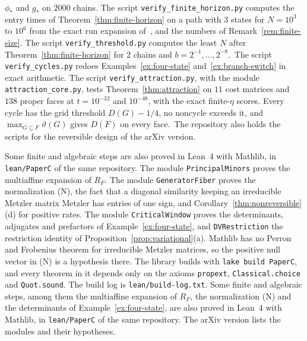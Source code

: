 $\phi_*$ and $g_*$ on $2000$ chains. The script \texttt{verify\_finite\_horizon.py} computes the
entry times of Theorem~\ref{thm:finite-horizon} on a path with 3 states for $N=10^3$ to $10^6$
from the exact run expansion of~\cite[Lemma~2.3]{paperC1}, and the numbers of
Remark~\ref{rem:finite-size}. The script \texttt{verify\_threshold.py} computes the least $N$ after
Theorem~\ref{thm:finite-horizon} for 2 chains and $b=2^{-1},\dots,2^{-8}$.\fi\ The script
\texttt{verify\_cycles.py} redoes Examples~\ref{ex:four-state} and~\ref{ex:branch-switch} in exact
arithmetic. The script \texttt{verify\_attraction.py}, with the module \texttt{attraction\_core.py},
tests Theorem~\ref{thm:attraction} on $11$ cost matrices and $138$ proper faces at $t=10^{-32}$ and
$10^{-48}$, with the exact finite-$\eta$ scores. Every cycle has the grid threshold $D(G)-1/4$, no
noncycle exceeds it, and $\max_{G\subseteq F}\vartheta(G)$ gives $D(F)$ on every face.\ifarxivbuild\else\
The repository also holds the scripts for the reversible design of the arXiv version.\fi

\ifarxivbuild
Some finite and algebraic steps are also proved in Lean~4 with Mathlib, in
\nolinkurl{lean/PaperC} of the same repository. The module \texttt{PrincipalMinors} proves the
multiaffine expansion of $R_F$. The module \texttt{GeneratorFiber} proves the normalization (N),
the fact that a diagonal similarity keeping an irreducible Metzler matrix Metzler has entries of
one sign, and Corollary~\ref{thm:nonreversible}(d) for positive rates. The module
\texttt{CriticalWindow} proves the determinants, adjugates and prefactors of
Example~\ref{ex:four-state}, and \texttt{DVRestriction} the restriction identity of
Proposition~\ref{prop:variational}(a). Mathlib has no Perron and Frobenius theorem for irreducible
Metzler matrices, so the positive null vector in (N) is a hypothesis there. The library builds
with \texttt{lake build PaperC}, and every theorem in it depends only on the axioms
\texttt{propext}, \texttt{Classical.choice} and \texttt{Quot.sound}. The build log is
\nolinkurl{lean/build-log.txt}.
\else
Some finite and algebraic steps, among them the multiaffine expansion of $R_F$, the
normalization (N) and the determinants of Example~\ref{ex:four-state}, are also proved in Lean~4
with Mathlib, in \nolinkurl{lean/PaperC} of the same repository. The arXiv version lists the
modules and their hypotheses.
\fi

